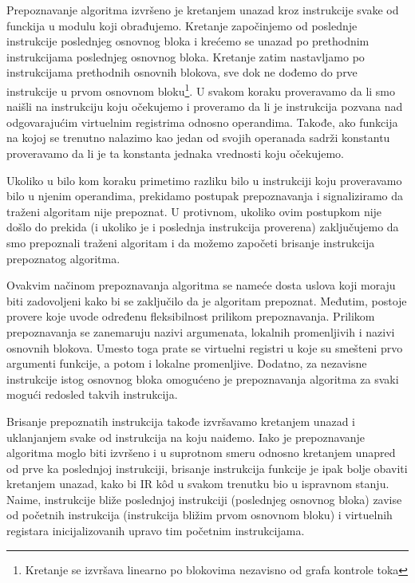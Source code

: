 \documentclass[12pt,oneside]{memoir}
\begin{document}
Prepoznavanje algoritma izvršeno je kretanjem unazad kroz instrukcije svake od 
funckija u modulu koji obrađujemo. Kretanje započinjemo od 
poslednje instrukcije poslednjeg osnovnog bloka i krećemo se unazad po 
prethodnim instrukcijama poslednjeg osnovnog bloka. Kretanje zatim nastavljamo po instrukcijama prethodnih osnovnih blokova, sve dok ne dođemo do prve instrukcije u prvom 
osnovnom bloku\footnote{Kretanje se izvršava linearno po blokovima nezavisno od grafa kontrole toka}. U svakom koraku proveravamo da li smo naišli na instrukciju 
koju očekujemo i proveramo da li je instrukcija pozvana nad odgovarajućim 
virtuelnim registrima odnosno operandima. Takođe, ako funkcija na kojoj se trenutno nalazimo kao jedan od svojih operanada sadrži konstantu proveravamo da li je ta konstanta jednaka vrednosti koju očekujemo. 

Ukoliko u bilo kom koraku primetimo razliku bilo u instrukciji koju proveravamo bilo u njenim operandima, prekidamo postupak prepoznavanja i signaliziramo da traženi algoritam nije prepoznat. U protivnom, 
ukoliko ovim postupkom nije došlo do prekida (i ukoliko je i poslednja 
instrukcija proverena) zaključujemo da smo prepoznali traženi algoritam i da 
možemo započeti brisanje instrukcija prepoznatog algoritma. 



Ovakvim načinom prepoznavanja algoritma se nameće dosta uslova koji moraju biti zadovoljeni kako bi se zaključilo da je algoritam prepoznat. %
Međutim, postoje provere koje uvode određenu fleksibilnost prilikom prepoznavanja. Prilikom prepoznavanja se zanemaruju nazivi argumenata, lokalnih promenljivih i nazivi osnovnih blokova. Umesto toga prate se virtuelni registri u koje su smešteni prvo argumenti funkcije, a potom i lokalne promenljive.  Dodatno, za nezavisne instrukcije istog osnovnog bloka omogućeno je prepoznavanja algoritma za svaki mogući redosled takvih instrukcija.

Brisanje prepoznatih instrukcija takođe izvršavamo kretanjem unazad i uklanjanjem svake od instrukcija na koju naiđemo. Iako je prepoznavanje algoritma moglo biti izvršeno i u suprotnom smeru odnosno kretanjem unapred od prve ka poslednjoj instrukciji, brisanje instrukcija funkcije je ipak bolje obaviti kretanjem unazad, kako bi IR k\^od u svakom trenutku bio u ispravnom stanju. Naime, instrukcije bliže poslednjoj instrukciji (poslednjeg osnovnog bloka) zavise od početnih instrukcija (instrukcija bližim prvom osnovnom bloku) i virtuelnih registara
inicijalizovanih upravo tim početnim instrukcijama.
\end{document}
